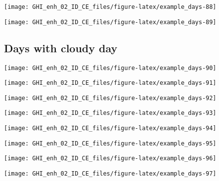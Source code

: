 \documentclass[
  10pt,
  a4paper,oneside]{article}
\begin{document}
\begin{center}\texttt{[image: GHI\_enh\_02\_ID\_CE\_files/figure-latex/example\_days-88]} \end{center}

\begin{center}\texttt{[image: GHI\_enh\_02\_ID\_CE\_files/figure-latex/example\_days-89]} \end{center}

\FloatBarrier

\hypertarget{days-with-cloudy-day}{%
\subsection{Days with cloudy day}\label{days-with-cloudy-day}}

\begin{center}\texttt{[image: GHI\_enh\_02\_ID\_CE\_files/figure-latex/example\_days-90]} \end{center}

\begin{center}\texttt{[image: GHI\_enh\_02\_ID\_CE\_files/figure-latex/example\_days-91]} \end{center}

\begin{center}\texttt{[image: GHI\_enh\_02\_ID\_CE\_files/figure-latex/example\_days-92]} \end{center}

\begin{center}\texttt{[image: GHI\_enh\_02\_ID\_CE\_files/figure-latex/example\_days-93]} \end{center}

\begin{center}\texttt{[image: GHI\_enh\_02\_ID\_CE\_files/figure-latex/example\_days-94]} \end{center}

\begin{center}\texttt{[image: GHI\_enh\_02\_ID\_CE\_files/figure-latex/example\_days-95]} \end{center}

\begin{center}\texttt{[image: GHI\_enh\_02\_ID\_CE\_files/figure-latex/example\_days-96]} \end{center}

\begin{center}\texttt{[image: GHI\_enh\_02\_ID\_CE\_files/figure-latex/example\_days-97]} \end{center}
\end{document}
